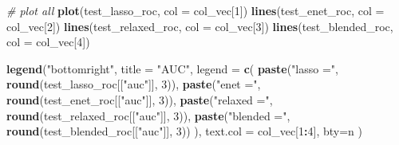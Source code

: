 \documentclass[
]{book}
\newenvironment{Shaded}{\begin{snugshade}}{\end{snugshade}}
\newcommand{\CommentTok}[1]{\textcolor[rgb]{0.56,0.35,0.01}{\textit{#1}}}
\newcommand{\DataTypeTok}[1]{\textcolor[rgb]{0.13,0.29,0.53}{#1}}
\newcommand{\DecValTok}[1]{\textcolor[rgb]{0.00,0.00,0.81}{#1}}
\newcommand{\KeywordTok}[1]{\textcolor[rgb]{0.13,0.29,0.53}{\textbf{#1}}}
\newcommand{\NormalTok}[1]{#1}
\newcommand{\OperatorTok}[1]{\textcolor[rgb]{0.81,0.36,0.00}{\textbf{#1}}}
\newcommand{\StringTok}[1]{\textcolor[rgb]{0.31,0.60,0.02}{#1}}
\begin{document}
\begin{Shaded}
\begin{Highlighting}[]
\CommentTok{\# plot all}
\KeywordTok{plot}\NormalTok{(test\_lasso\_roc, }\DataTypeTok{col =}\NormalTok{ col\_vec[}\DecValTok{1}\NormalTok{])}
\KeywordTok{lines}\NormalTok{(test\_enet\_roc, }\DataTypeTok{col =}\NormalTok{ col\_vec[}\DecValTok{2}\NormalTok{])}
\KeywordTok{lines}\NormalTok{(test\_relaxed\_roc, }\DataTypeTok{col =}\NormalTok{ col\_vec[}\DecValTok{3}\NormalTok{])}
\KeywordTok{lines}\NormalTok{(test\_blended\_roc, }\DataTypeTok{col =}\NormalTok{ col\_vec[}\DecValTok{4}\NormalTok{])}

\KeywordTok{legend}\NormalTok{(}\StringTok{"bottomright"}\NormalTok{,}
  \DataTypeTok{title =} \StringTok{"AUC"}\NormalTok{,}
  \DataTypeTok{legend =} \KeywordTok{c}\NormalTok{(}
    \KeywordTok{paste}\NormalTok{(}\StringTok{"lasso ="}\NormalTok{, }\KeywordTok{round}\NormalTok{(test\_lasso\_roc[[}\StringTok{"auc"}\NormalTok{]], }\DecValTok{3}\NormalTok{)),}
    \KeywordTok{paste}\NormalTok{(}\StringTok{"enet ="}\NormalTok{, }\KeywordTok{round}\NormalTok{(test\_enet\_roc[[}\StringTok{"auc"}\NormalTok{]], }\DecValTok{3}\NormalTok{)),}
    \KeywordTok{paste}\NormalTok{(}\StringTok{"relaxed ="}\NormalTok{, }\KeywordTok{round}\NormalTok{(test\_relaxed\_roc[[}\StringTok{"auc"}\NormalTok{]], }\DecValTok{3}\NormalTok{)),}
    \KeywordTok{paste}\NormalTok{(}\StringTok{"blended ="}\NormalTok{, }\KeywordTok{round}\NormalTok{(test\_blended\_roc[[}\StringTok{"auc"}\NormalTok{]], }\DecValTok{3}\NormalTok{))}
\NormalTok{  ),}
  \DataTypeTok{text.col =}\NormalTok{ col\_vec[}\DecValTok{1}\OperatorTok{:}\DecValTok{4}\NormalTok{],}
  \DataTypeTok{bty=}\StringTok{\textquotesingle{}n\textquotesingle{}}
\NormalTok{)}
\end{Highlighting}
\end{Shaded}
\end{document}
